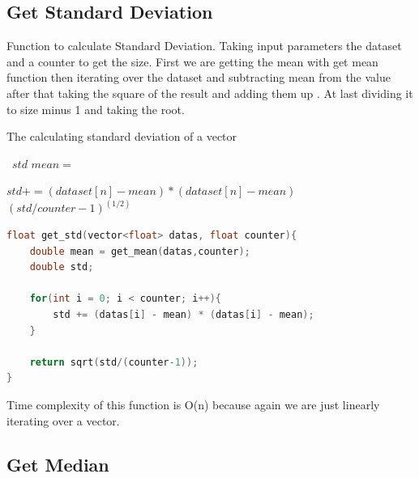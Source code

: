 \documentclass[a4paper, 12pt, titlepage]{article}
\begin{document}
\subsection{Get Standard Deviation}

    Function to calculate Standard Deviation. Taking input parameters the dataset and a counter to get the size. First we are getting the mean with get mean function then iterating over the dataset and subtracting mean from the value after that taking the square of the result and adding them up . At last dividing it to size minus 1 and taking the root.

\begin{algorithm}[H]
	\caption{The calculating standard deviation of a vector}
	\label{algo:dfs}
	\begin{algorithmic}

		
            \State\ $std$
            \State $mean = $ 


                    \State $ std += (dataset[n]-mean)*(dataset[n]-mean) $
                \EndIf
            \EndFor
		\State \Return $ (std/counter-1)^(1/2) $
	\EndFunction
	\end{algorithmic}
\end{algorithm}
    
\usepackage{\textbf{Code for Get Standard Deviation}}
\begin{lstlisting}[language=C++]
float get_std(vector<float> datas, float counter){          
    double mean = get_mean(datas,counter);
    double std;

    for(int i = 0; i < counter; i++){
        std += (datas[i] - mean) * (datas[i] - mean);
    }
    
    return sqrt(std/(counter-1));
}
\end{lstlisting}
Time complexity of this function is O(n) because again we are just linearly iterating over a vector. 

\newpage

\subsection{Get Median}
\end{document}
